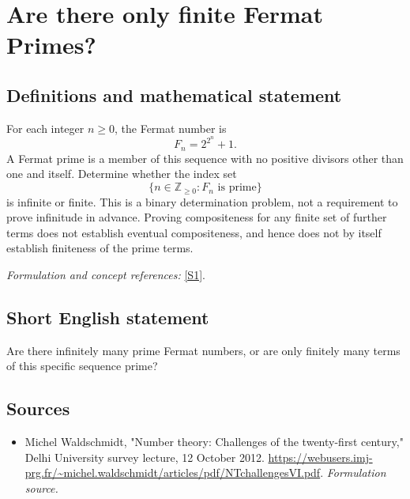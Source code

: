 \documentclass[11pt]{article}
\begin{document}
\section*{\texorpdfstring{Are there only finite Fermat Primes?}{Are there only finite Fermat Primes?}}\label{3373}
\subsection{Definitions and mathematical statement}
For each integer $n\ge0$, the Fermat number is
\[
 F_n=2^{2^n}+1.
\]
A Fermat prime is a member of this sequence with no positive divisors other than one and itself. Determine whether the index set
\[
 \{n\in{\mathbb{Z}}_{\ge0}:F_n\text{ is prime}\}
\]
is infinite or finite. This is a binary determination problem, not a requirement to prove infinitude in advance. Proving compositeness for any finite set of further terms does not establish eventual compositeness, and hence does not by itself establish finiteness of the prime terms.
\par\smallskip\textit{Formulation and concept references:} \href{https://webusers.imj-prg.fr/~michel.waldschmidt/articles/pdf/NTchallengesVI.pdf}{[S1]}.

\subsection{Short English statement}
Are there infinitely many prime Fermat numbers, or are only finitely many terms of this specific sequence prime?
\subsection{Sources}
\begin{itemize}
\item[S1]Michel Waldschmidt, "Number theory: Challenges of the twenty-first century," Delhi University survey lecture, 12 October 2012.
\url{https://webusers.imj-prg.fr/~michel.waldschmidt/articles/pdf/NTchallengesVI.pdf}.
\textit{Formulation source.}
\end{itemize}
\end{document}
